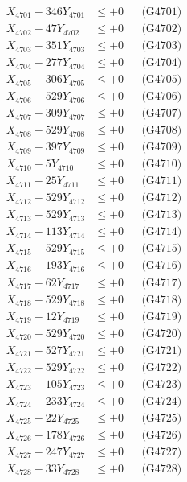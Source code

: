 \documentclass[a4paper,10pt]{article}
\begin{document}
{\begin{align}
\allowbreak
X_{4701} - 346Y_{4701} &\leq +0 && \text{(G4701)} \\
X_{4702} - 47Y_{4702} &\leq +0 && \text{(G4702)} \\
X_{4703} - 351Y_{4703} &\leq +0 && \text{(G4703)} \\
X_{4704} - 277Y_{4704} &\leq +0 && \text{(G4704)} \\
X_{4705} - 306Y_{4705} &\leq +0 && \text{(G4705)} \\
X_{4706} - 529Y_{4706} &\leq +0 && \text{(G4706)} \\
X_{4707} - 309Y_{4707} &\leq +0 && \text{(G4707)} \\
X_{4708} - 529Y_{4708} &\leq +0 && \text{(G4708)} \\
X_{4709} - 397Y_{4709} &\leq +0 && \text{(G4709)} \\
X_{4710} - 5Y_{4710} &\leq +0 && \text{(G4710)} \\
\allowbreak
X_{4711} - 25Y_{4711} &\leq +0 && \text{(G4711)} \\
X_{4712} - 529Y_{4712} &\leq +0 && \text{(G4712)} \\
X_{4713} - 529Y_{4713} &\leq +0 && \text{(G4713)} \\
X_{4714} - 113Y_{4714} &\leq +0 && \text{(G4714)} \\
X_{4715} - 529Y_{4715} &\leq +0 && \text{(G4715)} \\
X_{4716} - 193Y_{4716} &\leq +0 && \text{(G4716)} \\
X_{4717} - 62Y_{4717} &\leq +0 && \text{(G4717)} \\
X_{4718} - 529Y_{4718} &\leq +0 && \text{(G4718)} \\
X_{4719} - 12Y_{4719} &\leq +0 && \text{(G4719)} \\
X_{4720} - 529Y_{4720} &\leq +0 && \text{(G4720)} \\
\allowbreak
X_{4721} - 527Y_{4721} &\leq +0 && \text{(G4721)} \\
X_{4722} - 529Y_{4722} &\leq +0 && \text{(G4722)} \\
X_{4723} - 105Y_{4723} &\leq +0 && \text{(G4723)} \\
X_{4724} - 233Y_{4724} &\leq +0 && \text{(G4724)} \\
X_{4725} - 22Y_{4725} &\leq +0 && \text{(G4725)} \\
X_{4726} - 178Y_{4726} &\leq +0 && \text{(G4726)} \\
X_{4727} - 247Y_{4727} &\leq +0 && \text{(G4727)} \\
X_{4728} - 33Y_{4728} &\leq +0 && \text{(G4728)} \\

\end{align}}
\end{document}
